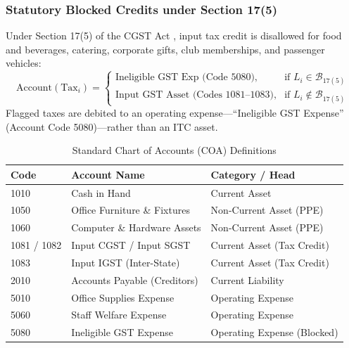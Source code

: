 \documentclass[conference]{IEEEtran}
\begin{document}
\subsubsection{Statutory Blocked Credits under Section 17(5)}
Under Section 17(5) of the CGST Act \cite{cgst2017act}, input tax credit is disallowed for food and beverages, catering, corporate gifts, club memberships, and passenger vehicles:
\begin{equation}
\text{Account}(\text{Tax}_i) = \begin{cases} 
\text{Ineligible GST Exp (Code 5080)}, & \text{if } L_i \in \mathcal{B}_{17(5)} \\ 
\text{Input GST Asset (Codes 1081--1083)}, & \text{if } L_i \notin \mathcal{B}_{17(5)} 
\end{cases}
\end{equation}
Flagged taxes are debited to an operating expense---``Ineligible GST Expense'' (Account Code 5080)---rather than an ITC asset.

\begin{table}[htbp]
\caption{Standard Chart of Accounts (COA) Definitions}
\begin{center}
\begin{tabularx}{\columnwidth}{llX}
\toprule
\textbf{Code} & \textbf{Account Name} & \textbf{Category / Head} \\
\midrule
1010 & Cash in Hand & Current Asset \\
1050 & Office Furniture \& Fixtures & Non-Current Asset (PPE) \\
1060 & Computer \& Hardware Assets & Non-Current Asset (PPE) \\
1081 / 1082 & Input CGST / Input SGST & Current Asset (Tax Credit) \\
1083 & Input IGST (Inter-State) & Current Asset (Tax Credit) \\
2010 & Accounts Payable (Creditors) & Current Liability \\
5010 & Office Supplies Expense & Operating Expense \\
5060 & Staff Welfare Expense & Operating Expense \\
5080 & Ineligible GST Expense & Operating Expense (Blocked) \\
\bottomrule
\end{tabularx}
\label{tab:coa}
\end{center}
\end{table}
\end{document}
